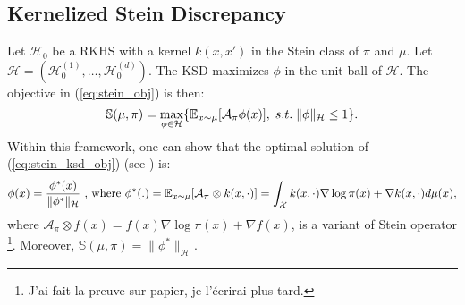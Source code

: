 \documentclass[runningheads,a4paper]{llncs}
\newcommand{\E}{\mathbb{E}}
\newcommand{\Sr}{\mathbb{S}}
\newcommand{\X}{\mathcal{X}}
\newcommand{\A}{\mathcal{A}}
\newcommand{\Hr}{\mathcal{H}}
\DeclarePairedDelimiter{\bra}{\{}{\}}
\DeclarePairedDelimiter{\sq}{[}{]}
\begin{document}
\subsection{Kernelized Stein Discrepancy}
Let $\Hr_0$ be a RKHS with a kernel $k(x, x')$ in the Stein class of $\pi$ and $\mu$.
Let $\Hr = (\Hr^{(1)}_0, \dots, \Hr^{(d)}_0)$. The KSD maximizes $\phi$ in the unit ball of $\Hr$.
The objective in (\ref{eq:stein_obj}) is then:
\begin{equation}
  \Sr(\mu, \pi) =
    \max_{\phi \in \Hr} \bra*{ \E_{x \sim \mu}[\A_\pi \phi (x)], \; s.t. \; \|\phi\|_{\Hr} \leq 1 }.
  \label{eq:stein_ksd_obj}
\end{equation}
Within this framework, one can show that the optimal solution of (\ref{eq:stein_ksd_obj})
(see \citep{https://doi.org/10.48550/arxiv.1602.03253,
      https://doi.org/10.48550/arxiv.1410.2392,
      https://doi.org/10.48550/arxiv.1602.02964}) is:
\begin{equation}
  \phi(x) = \frac{\phi^*(x)}{\|\phi^*\|_{\Hr}}
    \text{ , where } \phi^*(.) = \E_{x \sim \mu}\sq*{ \A_\pi \otimes k(x, \cdot) }
                               = \int_\X k(x, \cdot) \nabla \log \pi(x) + \nabla k(x, \cdot) d\mu(x),
  \label{eq:stein_ksd_sol}        
\end{equation}
where $\A_\pi \otimes f(x) = f(x) \nabla \log \pi(x) + \nabla f(x)$, is a variant of Stein operator
\footnote{J'ai fait la preuve sur papier, je l'écrirai plus tard.}.
Moreover, $\Sr(\mu, \pi) = \|\phi^*\|_\Hr$.
\end{document}
